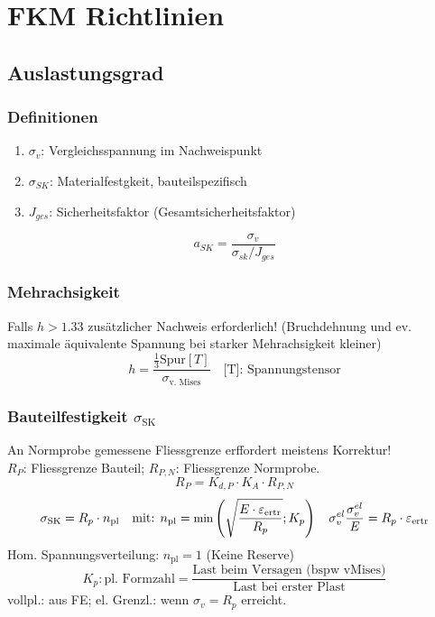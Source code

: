 \vspace{-2mm}
\section{FKM Richtlinien}{}
    \subsection{Auslastungsgrad}
     
        \subsubsection{Definitionen}
            \begin{enumerate}[noitemsep]
                \item $\sigma_{v}$: Vergleichsspannung im Nachweispunkt
                \item $\sigma_{SK}$: Materialfestgkeit, bauteilspezifisch
                \item $J_{ges}$: Sicherheitsfaktor (Gesamtsicherheitsfaktor)
            \end{enumerate}
            \vspace{-1mm}\[a_{SK} = \frac{\sigma_{v}}{\sigma_{sk}/J_{ges}} \]
    
        \subsubsection{Mehrachsigkeit}
            Falls $h > 1.33$ zusätzlicher Nachweis erforderlich! (Bruchdehnung und ev. maximale äquivalente Spannung bei starker Mehrachsigkeit kleiner)
            \vspace{-2mm}\[ h = \frac{\frac{1}{3} \textrm{Spur}[T]}{\sigma_{\textrm{v. Mises}}} \quad \textrm{[T]: Spannungstensor}\]
        \subsubsection{Bauteilfestigkeit $\sigma_{\textrm{SK}}$}
            An Normprobe gemessene Fliessgrenze erffordert meistens Korrektur! \\$R_P$: Fliessgrenze Bauteil; $R_{P,N}$: Fliessgrenze Normprobe.
            \vspace{-2mm}
            \[R_P = K_{d,P}\cdot K_A\cdot R_{P,N}\]
            \vspace{-4mm}
            \[\sigma_{\textrm{SK}}=R_p\cdot n_{\textrm{pl}} \quad\textrm{mit: } \small n_{\textrm{pl}}=\textrm{min} \left( \sqrt{ \frac{E\cdot\varepsilon_{\textrm{ertr}}}{R_p}};K_p \right) \quad \sigma_v^{el}\frac{\sigma_v^{el}}{E}=R_p\cdot\varepsilon_{\textrm{ertr}}\]\normalsize
            Hom. Spannungsverteilung: $n_{\textrm{pl}}=1$ (Keine Reserve)
            \vspace{-1mm}
            \[K_p: \textrm{pl. Formzahl} = \frac{\textrm{Last beim Versagen 
            (bspw vMises)}}{\textrm{Last bei erster Plast}}\]
            vollpl.: aus FE; el. Grenzl.: wenn $\sigma_v = R_p$ erreicht.
\vfill\null\columnbreak
